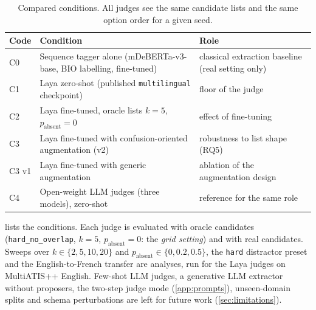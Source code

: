 \begin{table}[pos=t]
\centering
\small
\caption{Compared conditions. All judges see the same candidate lists and the same option order for a given seed.}
\label{tab:conditions}
\begin{tabular}{@{}lp{6.3cm}p{5.0cm}@{}}
\toprule
Code & Condition & Role \\
\midrule
C0 & Sequence tagger alone (mDeBERTa-v3-base, BIO labelling, fine-tuned) & classical extraction baseline (real setting only) \\
C1 & Laya zero-shot (published \texttt{multilingual} checkpoint) & floor of the judge \\
C2 & Laya fine-tuned, oracle lists $k=5$, $p_{\text{absent}}=0$ & effect of fine-tuning \\
C3 & Laya fine-tuned with confusion-oriented augmentation (v2) & robustness to list shape (RQ5) \\
C3 v1 & Laya fine-tuned with generic augmentation & ablation of the augmentation design \\
C4 & Open-weight LLM judges (three models), zero-shot & reference for the same role \\
\bottomrule
\end{tabular}
\end{table}

 lists the conditions. Each judge is evaluated with oracle candidates (\texttt{hard\_no\_overlap}, $k=5$, $p_{\text{absent}}=0$: the \emph{grid setting}) and with real candidates. Sweeps over $k\in\{2,5,10,20\}$ and $p_{\text{absent}}\in\{0,0.2,0.5\}$, the \texttt{hard} distractor preset and the English-to-French transfer are analyses, run for the Laya judges on MultiATIS++ English. Few-shot LLM judges, a generative LLM extractor without proposers, the two-step judge mode (\cref{app:prompts}), unseen-domain splits and schema perturbations are left for future work (\cref{sec:limitations}).


